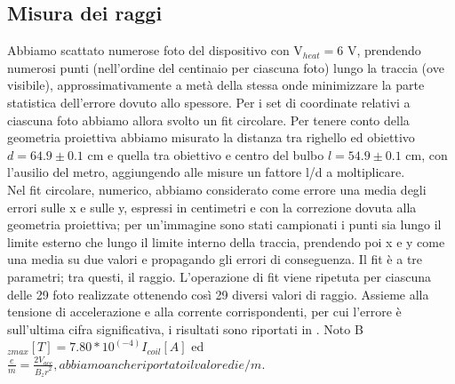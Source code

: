 \subsection{Misura dei raggi}
Abbiamo scattato numerose foto del dispositivo con V$_{heat} = 6$ V, prendendo numerosi punti (nell'ordine del centinaio per ciascuna foto) lungo la traccia (ove visibile), approssimativamente a metà della stessa onde minimizzare la parte statistica dell'errore dovuto allo spessore. Per i set di coordinate relativi a ciascuna foto abbiamo allora svolto un fit circolare. Per tenere conto della geometria proiettiva abbiamo misurato la distanza tra righello ed obiettivo $d=64.9 \pm 0.1$ cm e quella tra obiettivo e centro del bulbo $l=54.9 \pm 0.1$ cm, con l'ausilio del metro, aggiungendo alle misure un fattore l/d a moltiplicare.\\
Nel fit circolare, numerico, abbiamo considerato come errore una media degli errori sulle x e sulle y, espressi in centimetri e con la correzione dovuta alla geometria proiettiva; per un'immagine sono stati campionati i punti sia lungo il limite esterno che lungo il limite interno della traccia, prendendo poi x e y come una media su due valori e propagando gli errori di conseguenza. Il fit è a tre parametri; tra questi, il raggio. L'operazione di fit viene ripetuta per ciascuna delle 29 foto realizzate ottenendo così 29 diversi valori di raggio. Assieme alla tensione di accelerazione e alla corrente corrispondenti, per cui l'errore è sull'ultima cifra significativa, i risultati sono riportati in . Noto B$_{zmax}[T] = 7.80*10^(-4)I_{coil}[A]$ ed $\frac{e}{m}= \frac{2V_{acc}}{{B_{z}r}^2}, abbiamo anche riportato il valore di e/m$.\\
